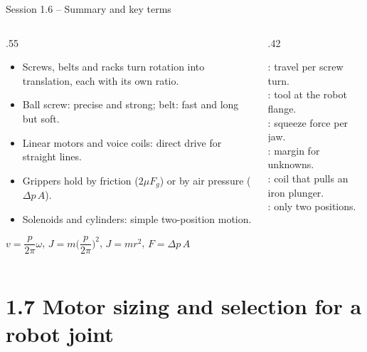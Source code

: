 \documentclass[aspectratio=169,10pt]{beamer}
\begin{document}
\begin{frame}{Session 1.6 -- Summary and key terms}
\begin{columns}[T]
\begin{column}{.55\textwidth}
\small
\begin{itemize}
\item Screws, belts and racks turn rotation into translation, each with its own ratio.
\item Ball screw: precise and strong; belt: fast and long but soft.
\item Linear motors and voice coils: direct drive for straight lines.
\item Grippers hold by friction ($2\mu F_g$) or by air pressure ($\Delta p\,A$).
\item Solenoids and cylinders: simple two-position motion.
\end{itemize}
\begin{keybox}[Remember]
$v=\dfrac{p}{2\pi}\omega$, \; $J=m\Big(\dfrac{p}{2\pi}\Big)^2$, \; $J=m r^2$, \; $F=\Delta p\,A$
\end{keybox}
\end{column}
\begin{column}{.42\textwidth}
\begin{defbox}
\small
{}: travel per screw turn.\\
: tool at the robot flange.\\
: squeeze force per jaw.\\
: margin for unknowns.\\
: coil that pulls an iron plunger.\\
: only two positions.
\end{defbox}
\end{column}
\end{columns}
\end{frame}

\section{1.7 Motor sizing and selection for a robot joint}
\end{document}
